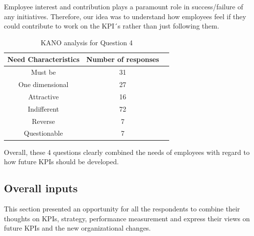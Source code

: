 \begin{enumerate}
Employee interest and contribution plays a paramount role in success/failure of any initiatives. Therefore, our idea was to understand how employees feel if they could contribute to work on the KPI´s rather than just following them.\\

\begin{table}[h]
    \centering
    \begin{tabular}{|c|c|c|}
    \hline
    \textbf{Need Characteristics} & \textbf{Number of responses} \\
    \hline
     Must be & 31\\\hline
     One dimensional & 27\\\hline
     Attractive & 16\\\hline
     Indifferent & 72 \\\hline
     Reverse & 7\\\hline
     Questionable & 7\\
    \hline
    \end{tabular}
    \caption{KANO analysis for Question 4}
    \label{tab:KANO4}
\end{table}
\end{enumerate}

Overall, these 4 questions clearly combined the needs of employees with regard to how future KPIs should be developed.

\subsection{Overall inputs}
This section presented an opportunity for all the respondents to combine their thoughts on KPIs, strategy, performance measurement and express their views on future KPIs and the new organizational changes.\\


